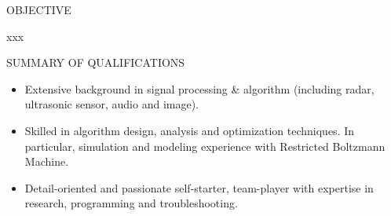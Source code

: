 \documentclass{resume} %
\begin{document}
 
\begin{rSection}{OBJECTIVE} 

xxx

\end{rSection}


 
\begin{rSection}{SUMMARY OF QUALIFICATIONS}  
\begin{itemize}
\item Extensive background in signal processing \& algorithm (including radar, ultrasonic sensor, audio and image).
\item Skilled in algorithm design, analysis and optimization techniques. In particular, simulation and modeling experience with Restricted Boltzmann Machine.
\item Detail-oriented and passionate self-starter, team-player with expertise in research, programming and troubleshooting.
\end{itemize}
\end{rSection}

\end{document}
